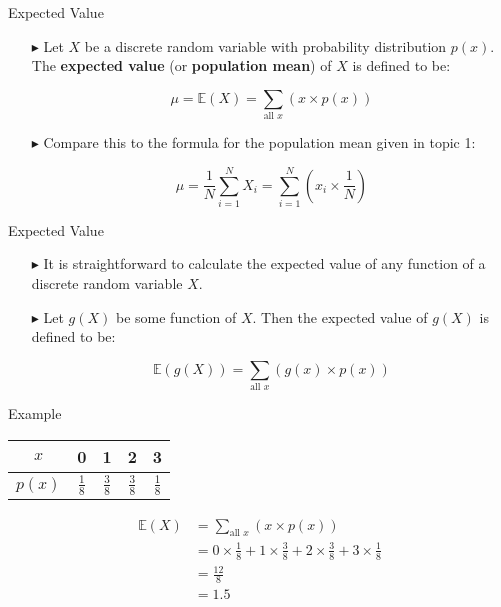 \documentclass[12pt]{beamer}
\begin{document}
\begin{frame}{Expected Value}
	
	\begin{itemize}
		\item[\color{blue}$\blacktriangleright$] Let $X$ be a discrete random variable with probability distribution $p(x)$. The \textbf{expected value} (or \textbf{population mean}) of $X$ is defined to be:
		
		\[ \mu = \mathbb E(X) = \sum_{\text{all }x} (x \times p(x)) \]
		
		\item[\color{blue}$\blacktriangleright$] Compare this to the formula for the population mean given in topic 1:
		
		\[ \mu = \frac{1}{N} \sum_{i=1}^N X_i = \sum_{i=1}^N \left(x_i \times \frac{1}{N}\right) \]
	\end{itemize}
	
\end{frame}

\begin{frame}{Expected Value}
	
	\begin{itemize}
		\item[\color{blue}$\blacktriangleright$] It is straightforward to calculate the expected value of any function of a discrete random variable $X$.
		
		\item[\color{blue}$\blacktriangleright$] Let $g(X)$ be some function of $X$. Then the expected value of $g(X)$ is defined to be:
		
		$$\mathbb E(g(X))=\sum_{\text{all }x}(g(x)\times p(x))$$
	\end{itemize}
	
\end{frame}

\begin{frame}{Example}
	\begin{center}
		\begin{tabular}{ccccc}
			\toprule
			$x$&0&1&2&3\\
			\toprule
			$p(x)$&$\frac{1}{8}$&$\frac{3}{8}$&$\frac{3}{8}$&$\frac{1}{8}$\\
			\bottomrule
		\end{tabular}
	\end{center}
	
	\begin{align*}
		\mathbb E(X)&=\sum_{\text{all }x}(x\times p(x))\\
		&=0\times\frac{1}{8}+1\times\frac{3}{8}+2\times\frac{3}{8}+3\times\frac{1}{8}\\
		&=\frac{12}{8}\\
		&=1.5
	\end{align*}
\end{frame}
\end{document}
